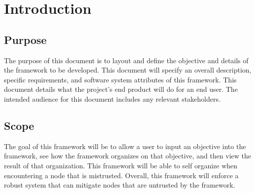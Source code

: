\documentclass[draftclsnofoot, onecolumn, compsoc, 10pt]{IEEEtran}
\begin{document}
\section{Introduction}
\subsection{Purpose} 
The purpose of this document is to layout and define the objective and details of the framework to be developed. This document will specify an overall description, specific requirements, and software system attributes of this framework. This document details what the project's end product will do for an end user. The intended audience for this document includes any relevant stakeholders. 

\subsection{Scope}
The goal of this framework will be to allow a user to input an objective into the framework, see how the framework organizes on that objective, and then view the result of that organization. This framework will be able to self organize when encountering a node that is mistrusted. Overall, this framework will enforce a robust system that can mitigate nodes that are untrusted by the framework.

\end{document}
